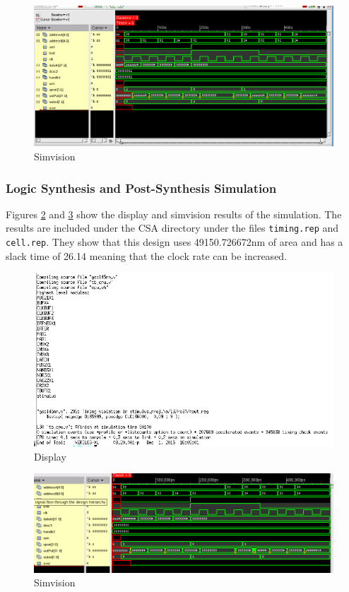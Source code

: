 \documentclass[12pt]{article}
\begin{document}
\begin{figure}[H]
\centering
\includegraphics[width=\linewidth]{../CSeA/CSeA-test}
\caption{Simvision}
\label{fig:CSeA-test}
\end{figure}

\subsubsection{Logic Synthesis and Post-Synthesis Simulation}
Figures \ref{fig:synth-text-CSeA} and \ref{fig:synth-test-CSeA} show the display and simvision results of the simulation. The results are included under the CSA directory under the files \texttt{timing.rep} and \texttt{cell.rep}. They show that this design uses 49150.726672nm of area and has a slack time of 26.14 meaning that the clock rate can be increased.
\begin{figure}[H]
\centering
\includegraphics[width=.7\linewidth]{../CSeA/synth-text}
\caption{Display}
\label{fig:synth-text-CSeA}
\end{figure}
\begin{figure}[H]
\centering
\includegraphics[width=\linewidth]{../CSeA/synth-test}
\caption{Simvision}
\label{fig:synth-test-CSeA}
\end{figure}
\end{document}
